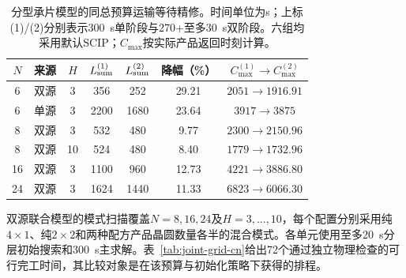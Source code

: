 \documentclass[final,5p,times,twocolumn]{elsarticle}
\begin{document}
\begin{table}[!t]
\centering\scriptsize\setlength{\tabcolsep}{2pt}
\caption{分型承片模型的同总预算运输等待精修。时间单位为s；上标(1)/(2)分别表示300~s单阶段与270+至多30~s双阶段。六组均采用默认SCIP；$C_{\max}$按实际产品返回时刻计算。}
\label{tab:joint-refinement-cn}
\begin{tabular}{ccccccc}\toprule
$N$ & 来源 & $H$ & $L_{\rm sum}^{(1)}$ & $L_{\rm sum}^{(2)}$ & 降幅（\%） & $C_{\max}^{(1)}\to C_{\max}^{(2)}$\\\midrule
6 & 双源 & 3 & 356 & 252 & 29.21 & $2051\to1916.91$\\
6 & 单源 & 3 & 2200 & 1680 & 23.64 & $3917\to3875$\\
8 & 双源 & 3 & 532 & 480 & 9.77 & $2300\to2150.96$\\
8 & 双源 & 10 & 524 & 480 & 8.40 & $1779\to1732.96$\\
16 & 双源 & 3 & 1100 & 960 & 12.73 & $4221\to3886.80$\\
24 & 双源 & 3 & 1624 & 1440 & 11.33 & $6823\to6066.30$\\
\bottomrule\end{tabular}\end{table}



双源联合模型的模式扫描覆盖$N=8,16,24$及$H=3,\ldots,10$，每个配置分别采用纯$4\times1$、纯$2\times2$和两种配方产品晶圆数量各半的混合模式。各单元使用至多20~s分层初始搜索和300~s主求解。表~\ref{tab:joint-grid-cn}给出72个通过独立物理检查的可行完工时间，其比较对象是在该预算与初始化策略下获得的排程。
\end{document}
